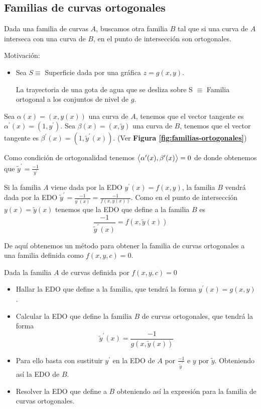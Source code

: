 \documentclass{mathnotes}
\begin{document}
\subsection{Familias de curvas ortogonales}
Dada una familia de curvas $A$, buscamos otra familia $B$ tal que si una curva de $A$ interseca con una curva de $B$, en el punto de intersección son ortogonales.

Motivación:
\begin{itemize}
\item Sea $S\equiv$ Superficie dada por una gráfica $z=g(x,y)$. 

La trayectoria de una gota de agua que se desliza sobre S $\equiv$ Familia ortogonal a los conjuntos de nivel de $g$.
\end{itemize}


Sea $\alpha(x) = (x, y(x))$ una curva de $A$, tenemos que el vector tangente es $\alpha^\prime(x) = (1, y^\prime)$. Sea $\beta(x) = (x, \tilde{y})$ una curva de $B$, tenemos que el vector tangente es $\beta^\prime(x) = (1, \tilde{y}^\prime(x))$. (Ver \textbf{Figura \ref{fig:familias-ortogonales}})

Como condición de ortogonalidad tenemos $\left\langle \alpha^\prime(x),\beta^\prime(x)\right\rangle=0$ de donde obtenemos que $\tilde{y}^\prime = \frac{-1}{y^\prime}$

Si la familia $A$ viene dada por la EDO $y^\prime(x) = f(x,y)$, la familia $B$ vendrá dada por la EDO $\tilde{y}^\prime = \frac{-1}{y^\prime(x)} = \frac{-1}{f(x,y(x))}$. Como en el punto de intersección $y(x) = \tilde{y}(x)$ tenemos que la EDO que define a la familia $B$ es $$\frac{-1}{\tilde{y}^\prime(x)} = f(x, \tilde{y}(x))$$

De aquí obtenemos un método para obtener la familia de curvas ortogonales a una familia definida como $f(x,y,c) = 0$.

\begin{method}
Dada la familia $A$ de curvas definida por $f(x,y,c) = 0$
\begin{itemize}
\item Hallar la EDO que define a la familia, que tendrá la forma $y^\prime(x) = g(x,y)$.
\item Calcular la EDO que define la familia $B$ de curvas ortogonales, que tendrá la forma $$\tilde{y}^\prime(x) = \frac{-1}{g(x, \tilde{y}(x))}$$
\item Para ello basta con sustituir $y^\prime$ en la EDO de $A$ por $\frac{-1}{\tilde{y}^\prime}$ e $y$ por $\tilde{y}$. Obteniendo así la EDO de $B$.
\item Resolver la EDO que define a $B$ obteniendo así la expresión para la familia de curvas ortogonales.
\end{itemize}
\end{method}
\end{document}
